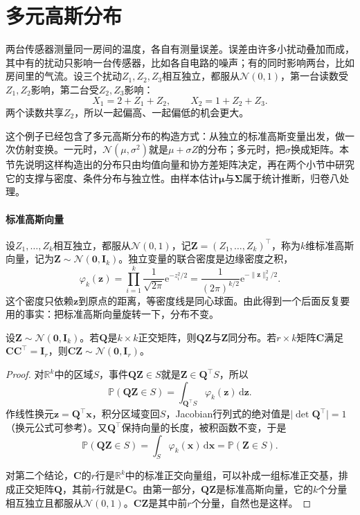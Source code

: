 \section{多元高斯分布}
\label{sec:mvd-gaussian}

两台传感器测量同一房间的温度，各自有测量误差。误差由许多小扰动叠加而成，其中有的扰动只影响一台传感器，比如各自电路的噪声；有的同时影响两台，比如房间里的气流。设三个扰动$Z_1,Z_2,Z_3$相互独立，都服从$\mathcal{N}(0,1)$，第一台读数受$Z_1,Z_2$影响，第二台受$Z_2,Z_3$影响：
\[
 X_1=2+Z_1+Z_2,\qquad X_2=1+Z_2+Z_3 .
\]
两个读数共享$Z_2$，所以一起偏高、一起偏低的机会更大。

这个例子已经包含了多元高斯分布的构造方式：从独立的标准高斯变量出发，做一次仿射变换。一元时，$\mathcal{N}(\mu,\sigma^{2})$就是$\mu+\sigma Z$的分布；多元时，把$\sigma$换成矩阵。本节先说明这样构造出的分布只由均值向量和协方差矩阵决定，再在两个小节中研究它的支撑与密度、条件分布与独立性。由样本估计$\bm{\mu}$与$\bm{\Sigma}$属于统计推断，归卷八处理。

\paragraph{标准高斯向量}
设$Z_1,\ldots,Z_k$相互独立，都服从$\mathcal{N}(0,1)$，记$\bm{Z}=(Z_1,\ldots,Z_k)^{\top}$，称为$k$维标准高斯向量，记为$\bm{Z}\sim\mathcal{N}(\bm{0},\bm{I}_k)$。独立变量的联合密度是边缘密度之积，
\[
 \varphi_k(\bm{z})=\prod_{i=1}^{k}\frac{1}{\sqrt{2\pi}}\mathrm{e}^{-z_i^{2}/2}=\frac{1}{(2\pi)^{k/2}}\mathrm{e}^{-\lVert\bm{z}\rVert_2^{2}/2} .
\]
这个密度只依赖$\bm{z}$到原点的距离，等密度线是同心球面。由此得到一个后面反复要用的事实：把标准高斯向量旋转一下，分布不变。

\begin{lemma}[旋转不变性]
\label{lem:mvd-rotation}
设$\bm{Z}\sim\mathcal{N}(\bm{0},\bm{I}_k)$。若$\bm{Q}$是$k\times k$正交矩阵，则$\bm{Q}\bm{Z}$与$\bm{Z}$同分布。若$r\times k$矩阵$\bm{C}$满足$\bm{C}\bm{C}^{\top}=\bm{I}_r$，则$\bm{C}\bm{Z}\sim\mathcal{N}(\bm{0},\bm{I}_r)$。
\end{lemma}

\begin{proof}
对$\mathbb{R}^{k}$中的区域$S$，事件$\bm{Q}\bm{Z}\in S$就是$\bm{Z}\in\bm{Q}^{\top}S$，所以
\[
 \mathbb{P}(\bm{Q}\bm{Z}\in S)=\int_{\bm{Q}^{\top}S}\varphi_k(\bm{z})\,\mathrm{d}\bm{z} .
\]
作线性换元$\bm{z}=\bm{Q}^{\top}\bm{x}$，积分区域变回$S$，Jacobian行列式的绝对值是$\lvert\det\bm{Q}^{\top}\rvert=1$（换元公式可参考）。又$\bm{Q}^{\top}$保持向量的长度，被积函数不变，于是
\[
 \mathbb{P}(\bm{Q}\bm{Z}\in S)=\int_{S}\varphi_k(\bm{x})\,\mathrm{d}\bm{x}=\mathbb{P}(\bm{Z}\in S) .
\]

对第二个结论，$\bm{C}$的$r$行是$\mathbb{R}^{k}$中的标准正交向量组，可以补成一组标准正交基，排成正交矩阵$\bm{Q}$，其前$r$行就是$\bm{C}$。由第一部分，$\bm{Q}\bm{Z}$是标准高斯向量，它的$k$个分量相互独立且都服从$\mathcal{N}(0,1)$。$\bm{C}\bm{Z}$是其中前$r$个分量，自然也是这样。
\end{proof}

